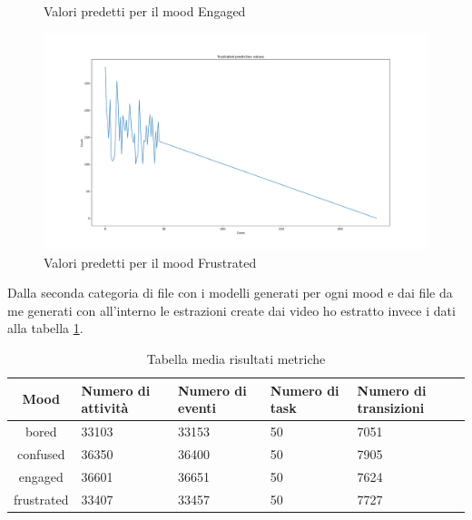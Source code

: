 \begin {itemize}
\begin{figure}
\begin{center}
        \caption{Valori predetti per il mood Engaged}
        \label{fig:image30}
    \end{center}
\end{figure}
\begin{figure}
    \begin{center}    
        \includegraphics[width=1\linewidth]{images/frustrated prediction values.png}
        \caption{Valori predetti per il mood Frustrated}
        \label{fig:image31}
    \end{center}
\end{figure}\clearpage
\end{itemize}
\newpage

Dalla seconda categoria di file con i modelli generati per ogni mood e dai file da me generati con all’interno le estrazioni create dai video ho estratto invece i dati alla tabella \ref{tab:2}.


\begin{table}
    \small
    \caption{Tabella media risultati metriche}
    \label{tab:2}
    \centering
    \begin{tabular}{|c|p{2.8cm}|p{2.8cm}|p{2.8cm}|p{2.8cm}|}
        \hline
        Mood       &   Numero di \newline attività &   Numero di eventi &   Numero di task &   Numero di \newline transizioni \\
        \hline
        bored      &              33103 &          33153 &            50 &                7051 \\
        \hline
        confused   &              36350 &          36400 &            50 &                7905 \\
        \hline
        engaged    &              36601 &          36651 &            50 &                7624 \\
        \hline
        frustrated &              33407 &          33457 &            50 &                7727 \\
        \hline
    \end{tabular}
\end{table}


